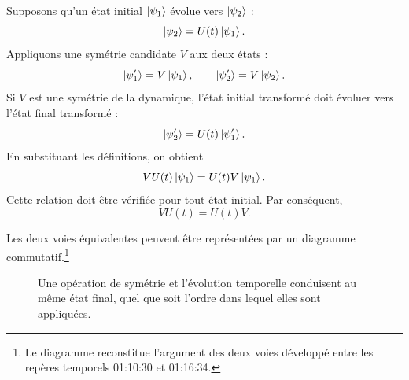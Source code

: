 Supposons qu’un état initial \(\left\lvert\psi_1\right\rangle\) évolue vers \(\left\lvert\psi_2\right\rangle\) :
\begin{equation}
\left\lvert\psi_2\right\rangle=U(t)\left\lvert\psi_1\right\rangle.
\end{equation}
Appliquons une symétrie candidate \(V\) aux deux états :
\begin{equation}
\left\lvert\psi_1'\right\rangle=V\left\lvert\psi_1\right\rangle,
\qquad
\left\lvert\psi_2'\right\rangle=V\left\lvert\psi_2\right\rangle.
\end{equation}
Si \(V\) est une symétrie de la dynamique, l’état initial transformé doit évoluer vers l’état final transformé :
\begin{equation}
\left\lvert\psi_2'\right\rangle=U(t)\left\lvert\psi_1'\right\rangle.
\end{equation}
En substituant les définitions, on obtient
\begin{equation}
VU(t)\left\lvert\psi_1\right\rangle
=
U(t)V\left\lvert\psi_1\right\rangle.
\end{equation}
Cette relation doit être vérifiée pour tout état initial. Par conséquent,
\begin{equation}
VU(t)=U(t)V.
\end{equation}

Les deux voies équivalentes peuvent être représentées par un diagramme commutatif.\footnote{Le diagramme reconstitue l’argument des deux voies développé entre les repères temporels 01:10:30 et 01:16:34.}\begin{figure}\centering
{}\caption{Une opération de symétrie et l’évolution temporelle conduisent au même état final, quel que soit l’ordre dans lequel elles sont appliquées.}\end{figure}

\begin{classroomqa}
\end{classroomqa}

